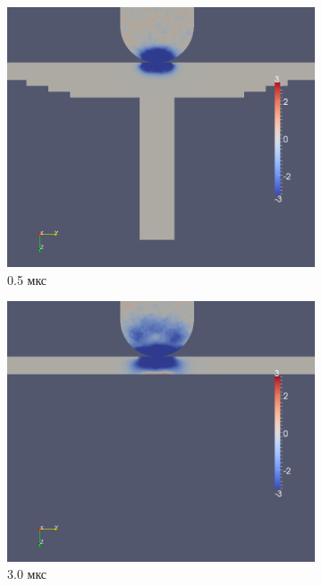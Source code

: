 \begin{figure}[H]
\begin{subfigure}[b]{0.5\textwidth}
\includegraphics[width=\textwidth]{png/pkm-experiment/wing-stringer/wave/syy-0001.png}
\caption{0.5 мкс}
\end{subfigure}
\begin{subfigure}[b]{0.5\textwidth}
\centering
\includegraphics[width=\textwidth]{png/pkm-experiment/wing-only/wave/syy-0003.png}
\caption{3.0 мкс}
\end{subfigure}
\begin{subfigure}[b]{0.5\textwidth}
\centering

\end{subfigure}
\end{figure}
